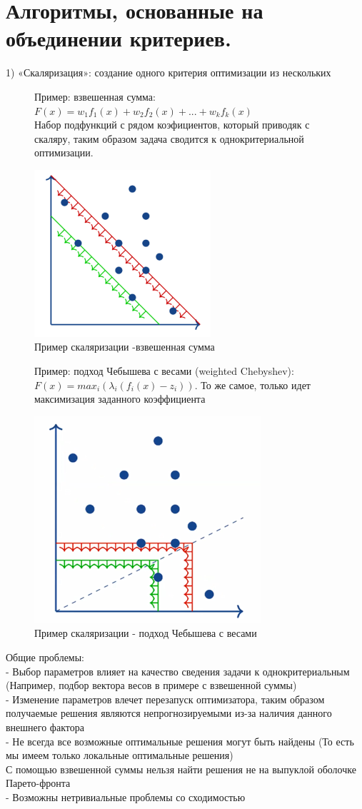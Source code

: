 \section{Алгоритмы, основанные на объединении критериев.}
1) «Скаляризация»: создание одного критерия оптимизации из нескольких
\begin{figure}[h]
Пример: взвешенная сумма: $F(x) = w_{1}f_{1}(x) + w_{2}f_{2}(x) + ...+ w_{k} f_{k} (x)$\\
Набор подфункций с рядом коэфициентов, который приводяк с скаляру, таким образом задача сводится к однокритериальной оптимизации.
\begin{center}
    \includegraphics[width=0.35\linewidth]{images/Scalar.PNG}
    \caption{Пример скаляризации -взвешенная сумма}
    \label{fig:mpr}
\end{center}
\end{figure}
\begin{figure}[h]
Пример: подход Чебышева с весами (weighted Chebyshev):\\
$F(x) = max_{i} (\lambda_{i}(f_{i}(x) − z_{i}))$. То же самое, только идет максимизация заданного коэффициента
\begin{center}
    \includegraphics[width=0.35\linewidth]{images/Scalar_Chebyshev.PNG}
    \caption{Пример скаляризации - подход Чебышева с весами}
    \label{fig:mpr}
\end{center}
\end{figure}

Общие проблемы:\\
- Выбор параметров влияет на качество сведения задачи к однокритериальным (Например, подбор вектора весов в примере с взвешенной суммы)\\
- Изменение параметров влечет перезапуск оптимизатора, таким образом получаемые решения являются непрогнозируемыми из-за наличия данного внешнего фактора\\
- Не всегда все возможные оптимальные решения могут быть найдены (То есть мы имеем только локальные оптимальные решения)\\
С помощью взвешенной суммы нельзя найти решения не на выпуклой оболочке Парето-фронта\\
- Возможны нетривиальные проблемы со сходимостью\\

